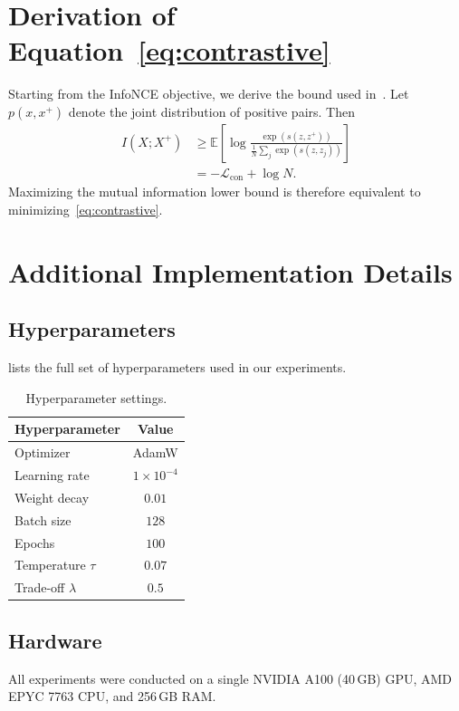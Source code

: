 \appendices

\section{Derivation of Equation~\eqref{eq:contrastive}}
\label{app:derivation}

Starting from the InfoNCE objective, we derive the bound used
in~. Let \(p(x,x^{+})\) denote the joint
distribution of positive pairs. Then
\begin{align}
  I(X; X^{+})
    &\geq \mathbb{E}\!\left[\log
       \frac{\exp(s(z, z^{+}))}{\frac{1}{N}\sum_j \exp(s(z, z_j))}\right]
       \nonumber \\
    &= -\mathcal{L}_{\text{con}} + \log N.
\end{align}
Maximizing the mutual information lower bound is therefore equivalent to
minimizing~\eqref{eq:contrastive}.

\section{Additional Implementation Details}
\label{app:impl}

\subsection{Hyperparameters}
 lists the full set of hyperparameters used in our
experiments.

\begin{table}[h]
  \caption{Hyperparameter settings.}
  \label{tab:hyperparams}
  \centering
  \small
  \begin{tabular}{lc}
    \toprule
    Hyperparameter        & Value \\
    \midrule
    Optimizer             & AdamW \\
    Learning rate         & \(1\times10^{-4}\) \\
    Weight decay          & \(0.01\) \\
    Batch size            & \(128\) \\
    Epochs                & \(100\) \\
    Temperature \(\tau\)  & \(0.07\) \\
    Trade-off \(\lambda\) & \(0.5\) \\
    \bottomrule
  \end{tabular}
\end{table}

\subsection{Hardware}
All experiments were conducted on a single NVIDIA A100 (40\,GB) GPU,
AMD EPYC 7763 CPU, and 256\,GB RAM.
